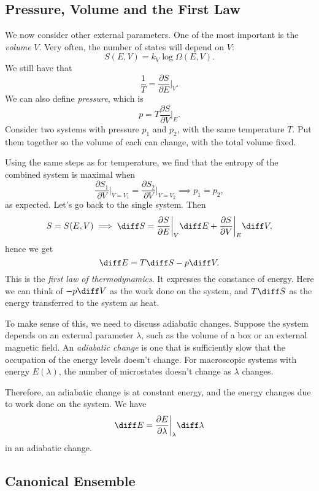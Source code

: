 \documentclass[12pt]{article}
\begin{document}
\subsection{Pressure, Volume and the First Law}
\label{sub:p_v}

We now consider other external parameters. One of the most important is the \emph{volume} $V$. Very often, the number of states will depend on $V$:
\[
S(E, V) = k_V \log \Omega(E, V).
\]
We still have that
\[
\frac{1}{T} = \frac{\partial S}{\partial E}\biggr|_V.
\]
We can also define \emph{pressure}, which is
\[
p = T \frac{\partial S}{\partial V} \biggr|_E.
\]
Consider two systems with pressure $p_1$ and $p_2$, with the same temperature $T$. Put them together so the volume of each can change, with the total volume fixed.

Using the same steps as for temperature, we find that the entropy of the combined system is maximal when
\[
\frac{\partial S_1}{\partial V} \biggr|_{V = V_1} = \frac{\partial S_2}{\partial V} \biggr|_{V = V_2} \implies p_1 = p_2,
\]
as expected. Let's go back to the single system. Then
\[
S = S(E, V) \implies \diff S = \frac{\partial S}{\partial E} \biggr|_V \diff E + \frac{\partial S}{\partial V} \biggr|_E \diff V,
\]
hence we get
\[
\diff E = T \diff S - p \diff V.
\]
This is the \emph{first law of thermodynamics}. It expresses the constance of energy. Here we can think of $-p \diff V$ as the work done on the system, and $T \diff S$ as the energy transferred to the system as heat.

To make sense of this, we need to discuss adiabatic changes. Suppose the system depends on an external parameter $\lambda$, such as the volume of a box or an external magnetic field. An \emph{adiabatic change} is one that is sufficiently slow that the occupation of the energy levels doesn't change. For macroscopic systems with energy $E(\lambda)$, the number of microstates doesn't change as $\lambda$ changes.

Therefore, an adiabatic change is at constant energy, and the energy changes due to work done on the system. We have
\[
	\diff E = \frac{\partial E}{\partial \lambda} \biggr|_\lambda \diff \lambda
\]
in an adiabatic change.

\subsection{Canonical Ensemble}
\label{sub:can_e}
\end{document}
